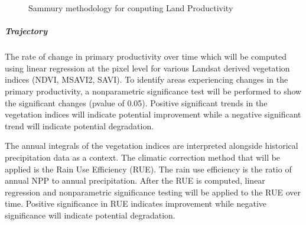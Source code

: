 \documentclass[letterpaper,10pt,english]{sphinxmanual}
\let\sphinxpxdimen\pdfpxdimen\else\newdimen\sphinxpxdimen
\begin{document}
\begin{figure}[H]
\centering
\capstart

\noindent\sphinxincludegraphics[width=700\sphinxpxdimen,height=500\sphinxpxdimen]{{sdgmethodology}.png}
\caption{Sammury methodology for conputing Land Productivity}\label{\detokenize{Background/LD_indicators:id3}}\end{figure}


\subparagraph{Trajectory}
\label{\detokenize{Background/LD_indicators:trajectory}}
\sphinxAtStartPar
The rate of change in primary productivity over time which will be computed using linear regression at the pixel level for various Landsat derived vegetation indices (NDVI, MSAVI2, SAVI). To identify areas experiencing changes in the primary productivity, a non\sphinxhyphen{}parametric significance test will be performed to show the significant changes (p\sphinxhyphen{}value of 0.05). Positive significant trends in the vegetation indices will indicate potential improvement while a negative significant trend will indicate potential degradation.

\sphinxAtStartPar
The annual integrals of the vegetation indices are interpreted alongside historical precipitation data as a context. The climatic correction method that will be applied is the Rain Use Efficiency (RUE). The rain use efficiency is the ratio of annual NPP to annual precipitation. After the RUE is computed, linear regression and nonparametric significance testing will be applied to the RUE over time. Positive significance in RUE indicates improvement while negative significance will indicate potential degradation.
\end{document}
